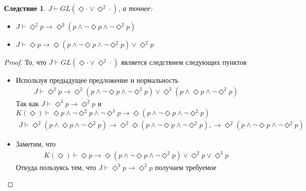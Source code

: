 \documentclass[12pt,a4paper,oneside]{article}
\newtheorem*{corollary}{Следствие}
\begin{document}
  \begin{corollary}
    $J \vdash GL(\Diamond\cdot \vee \Diamond^2\cdot)$, а точнее:
    \begin{itemize}
      \item $J \vdash \Diamond^2 p \rightarrow \Diamond^2(p \wedge \neg\Diamond p \wedge
            \neg\Diamond^2 p)$
      \item $J \vdash \Diamond p \rightarrow \Diamond(p \wedge \neg\Diamond p \wedge \neg\Diamond^2
            p) \vee \Diamond^2 p$
    \end{itemize}
  \end{corollary}
  \begin{proof}
    То, что $J \vdash GL(\Diamond\cdot \vee \Diamond^2\cdot)$ является следствием следующих пунктов
    \begin{itemize}
      \item Используя предыдущее предложение и нормальность
            \begin{align*}
              J \vdash \Diamond^2 p \rightarrow \Diamond^2(p \wedge \neg\Diamond p \wedge
              \neg\Diamond^2 p) \vee \Diamond^2(p \wedge \Diamond p \wedge \neg\Diamond^2 p)
            \end{align*}
            Так как $J \vdash \Diamond^3 p \rightarrow \Diamond^2 p$ и $K(\Diamond) \vdash
            \Diamond p \wedge \neg\Diamond^2 p \wedge \neg\Diamond^3 p \rightarrow \Diamond(p \wedge
            \neg\Diamond p \wedge \neg\Diamond^2 p)$
            \begin{align*}
              J \vdash \Diamond^2(p \wedge \Diamond p \wedge \neg\Diamond^2 p) \rightarrow
              \Diamond^2\Diamond(p \wedge \neg\Diamond p \wedge \neg\Diamond^2 p), \rightarrow
              \Diamond^2(p \wedge \neg\Diamond p \wedge \neg\Diamond^2 p)
            \end{align*}
      \item Заметим, что
            \begin{align*}
              K(\Diamond) \vdash \Diamond p \rightarrow \Diamond(p \wedge \neg\Diamond p \wedge
              \neg\Diamond^2 p) \vee \Diamond^2 p \vee \Diamond^3 p
            \end{align*}
            Откуда пользуясь тем, что $J \vdash \Diamond^3 p \rightarrow \Diamond^2 p$ получаем
            требуемое
    \end{itemize}
  \end{proof}
\end{document}
